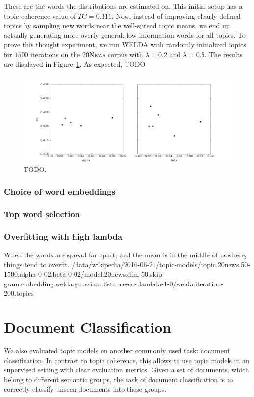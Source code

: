 \documentclass[
        a4paper,
        titlepage,
        twoside,
        parskip
        ]{scrbook}
\theoremstyle{break}
\begin{document}
These are the words the distributions are estimated on.
This initial setup has a topic coherence value of $TC = 0.311$.
Now, instead of improving clearly defined topics by sampling new words near the well-spread topic means, we end up actually generating more overly general, low information words for all topics.
To prove this thought experiment, we run WELDA with randomly initialized topics for $1500$ iterations on the \textsc{20News} corpus with $\lambda = 0.2$ and $\lambda = 0.5$.
The results are displayed in Figure~\ref{fig:standard_lda_as_prerequisite}.
As expected, TODO

\begin{figure}
       \centering
       \includegraphics[width=\textwidth]{figures/standard_lda_alpha_beta.png}
       \caption{TODO.}
       \label{fig:standard_lda_as_prerequisite}
\end{figure}



\subsubsection{Choice of word embeddings}
\subsubsection{Top word selection}

\subsubsection{Overfitting with high lambda}
When the words are spread far apart, and the mean is in the middle of nowhere, things tend to overfit.
/data/wikipedia/2016-06-21/topic-models/topic.20news.50-1500.alpha-0-02.beta-0-02/model.20news.dim-50.skip-gram.embedding.welda.gaussian.distance-cos.lambda-1-0/welda.iteration-200.topics



\section{Document Classification}
We also evaluated topic models on another commonly used task: document classification.
In contrast to topic coherence, this allows to use topic models in an supervised setting with clear evaluation metrics.
Given a set of documents, which belong to different semantic groups, the task of document classification is to correctly classify unseen documents into these groups.
\end{document}
